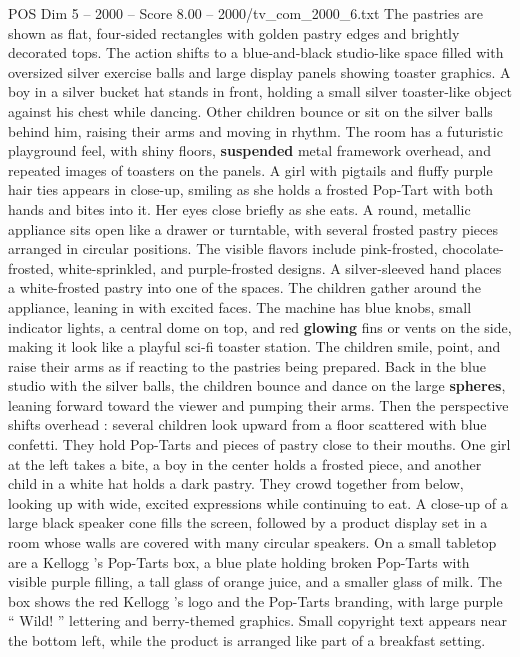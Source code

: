 \begin{textsample}{POS Dim 5 – 2000 – Score 8.00 – 2000/tv\_com\_2000\_6.txt}
The pastries are shown as flat, four-sided rectangles with golden pastry edges and brightly decorated tops.
The action shifts to a blue-and-black studio-like space filled with oversized silver exercise balls and large display panels showing toaster graphics.
A boy in a silver bucket hat stands in front, holding a small silver toaster-like object against his chest while dancing.
Other children bounce or sit on the silver balls behind him, raising their arms and moving in rhythm.
The room has a futuristic playground feel, with shiny floors, \textbf{suspended} metal framework overhead, and repeated images of toasters on the panels.
A girl with pigtails and fluffy purple hair ties appears in close-up, smiling as she holds a frosted Pop-Tart with both hands and bites into it.
Her eyes close briefly as she eats.
A round, metallic appliance sits open like a drawer or turntable, with several frosted pastry pieces arranged in circular positions.
The visible flavors include pink-frosted, chocolate-frosted, white-sprinkled, and purple-frosted designs.
A silver-sleeved hand places a white-frosted pastry into one of the spaces.
The children gather around the appliance, leaning in with excited faces.
The machine has blue knobs, small indicator lights, a central dome on top, and red \textbf{glowing} fins or vents on the side, making it look like a playful sci-fi toaster station.
The children smile, point, and raise their arms as if reacting to the pastries being prepared.
Back in the blue studio with the silver balls, the children bounce and dance on the large \textbf{spheres}, leaning forward toward the viewer and pumping their arms.
Then the perspective shifts overhead : several children look upward from a floor scattered with blue confetti.
They hold Pop-Tarts and pieces of pastry close to their mouths.
One girl at the left takes a bite, a boy in the center holds a frosted piece, and another child in a white hat holds a dark pastry.
They crowd together from below, looking up with wide, excited expressions while continuing to eat.
A close-up of a large black speaker cone fills the screen, followed by a product display set in a room whose walls are covered with many circular speakers.
On a small tabletop are a Kellogg ’s Pop-Tarts box, a blue plate holding broken Pop-Tarts with visible purple filling, a tall glass of orange juice, and a smaller glass of milk.
The box shows the red Kellogg ’s logo and the Pop-Tarts branding, with large purple “ Wild! ” lettering and berry-themed graphics.
Small copyright text appears near the bottom left, while the product is arranged like part of a breakfast setting.

\end{textsample}
